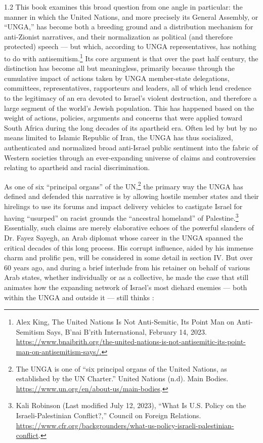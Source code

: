 \documentclass[../unravbook.tex]{subfiles}
\begin{document}
\begin{spacing}{1.2}
This book examines this broad question from one angle in particular: the manner in which the United Nations, and more precisely its General Assembly, or \enquote{UNGA,} has become both a breeding ground and a distribution mechanism for anti-Zionist narratives, and their normalization as political (and therefore protected) speech --- but which, according to UNGA representatives, has nothing to do with antisemitism.\footnote{Alex King, {The United Nations Is Not Anti-Semitic, Its Point Man on Anti-Semitism Says,} B'nai B'rith International, February 14, 2023. \url{https://www.bnaibrith.org/the-united-nations-is-not-antisemitic-its-point-man-on-antisemitism-says/.}} Its core argument is that over the past half century, the distinction has become all but meaningless, primarily because through the cumulative impact of actions taken by UNGA member-state delegations, committees, representatives, rapporteurs and leaders, all of which lend credence to the legitimacy of an era devoted to Israel's violent destruction, and therefore a large segment of the world's Jewish population. This has happened based on the weight of actions, policies, arguments and concerns that were applied toward South Africa during the long decades of its apartheid era. Often led by but by no means limited to Islamic Republic of Iran, the UNGA has thus socialized, authenticated and normalized broad anti-Israel public sentiment into the fabric of Western societies through an ever-expanding universe of claims and controversies relating to apartheid and racial discrimination. 

As one of six \enquote{principal organs} of the UN,\footnote{The UNGA is one of ``six principal organs of the United Nations, as established by the UN Charter.'' United Nations (n.d). Main Bodies. \url{https://www.un.org/en/about-us/main-bodies}.} the primary way the UNGA has defined and defended this narrative is by allowing hostile member states and their hirelings to use its forums and impact delivery vehicles to castigate Israel for having ``usurped'' on racist grounds the ``ancestral homeland'' of Palestine.\footnote{Kali Robinson (Last modified July 12, 2023), ``What Is U.S. Policy on the Israeli-Palestinian Conflict?,'' Council on Foreign Relations. \url{https://www.cfr.org/backgrounders/what-us-policy-israeli-palestinian-conflict}.} Essentially, such claims are merely elaborative echoes of the powerful slanders of Dr. Fayez Sayegh, an Arab diplomat whose career in the UNGA spanned the critical decades of this long process. His corrupt influence, aided by his immense charm and prolific pen, will be considered in some detail in section IV. But over 60 years ago, and during a brief interlude from his retainer on behalf of various Arab states, whether individually or as a collective, he made the case that still animates how the expanding network of Israel's most diehard enemies --- both within the UNGA and outside it --- still thinks \parencite[214]{Sayegh-1965}:


\end{spacing}
\end{document}
